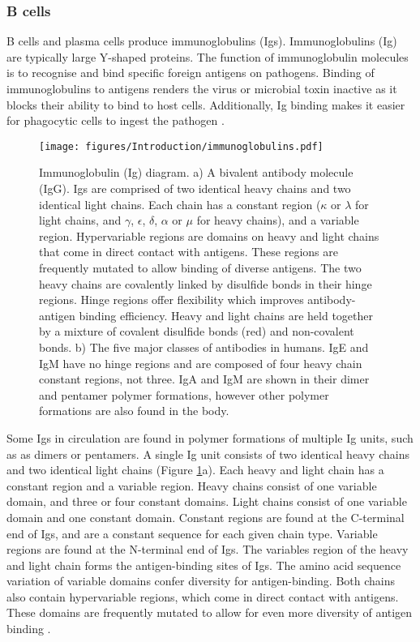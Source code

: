 \subsubsection{B cells}
B cells and plasma cells produce immunoglobulins (Igs).
Immunoglobulins (Ig) are typically large Y-shaped proteins.
The function of immunoglobulin molecules is to recognise and bind specific foreign antigens on pathogens.
Binding of immunoglobulins to antigens renders the virus or microbial toxin inactive as it blocks their ability to bind to host cells.
Additionally, Ig binding makes it easier for phagocytic cells to ingest the pathogen \cite{alberts2007molecularimmune}.
\begin{figure}[htb]
\centering\texttt{[image: figures/Introduction/immunoglobulins.pdf]}
\caption[Immunoglobulins diagram]{Immunoglobulin (Ig) diagram.
a) A bivalent antibody molecule (IgG).
Igs are comprised of two identical heavy chains and two identical light chains.
Each chain has a constant region ($\kappa$ or $\lambda$ for light chains, and $\gamma$, $\epsilon$, $\delta$, $\alpha$ or $\mu$ for heavy chains), and a variable region.
Hypervariable regions are domains on heavy and light chains that come in direct contact with antigens.
These regions are frequently mutated to allow binding of diverse antigens.
The two heavy chains are covalently linked by disulfide bonds in their hinge regions.
Hinge regions offer flexibility which improves antibody-antigen binding efficiency.
Heavy and light chains are held together by a mixture of covalent disulfide bonds (red) and non-covalent bonds.
b) The five major classes of antibodies in humans.
IgE and IgM have no hinge regions and are composed of four heavy chain constant regions, not three.
IgA and IgM are shown in their dimer and pentamer polymer formations, however other polymer formations are also found in the body.}
\label{fig:immunoglobulins_diagram}\end{figure}

Some Igs in circulation are found in polymer formations of multiple Ig units, such as as dimers or pentamers.
A single Ig unit consists  of two identical heavy chains and two identical light chains (Figure \ref{fig:immunoglobulins_diagram}a).
Each heavy and light chain has a constant region and a variable region.
Heavy chains consist of one variable domain, and three or four constant domains.
Light chains consist of one variable domain and one constant domain.
Constant regions are found at the C-terminal end of Igs, and are a constant sequence for each given chain type.
Variable regions are found at the N-terminal end of Igs.
The variables region of the heavy and light chain forms the antigen-binding sites of Igs.
The amino acid sequence variation of variable domains confer diversity for antigen-binding.
Both chains also contain hypervariable regions, which come in direct contact with antigens.
These domains are frequently mutated to allow for even more diversity of antigen binding \cite{schroeder2010structure}.

